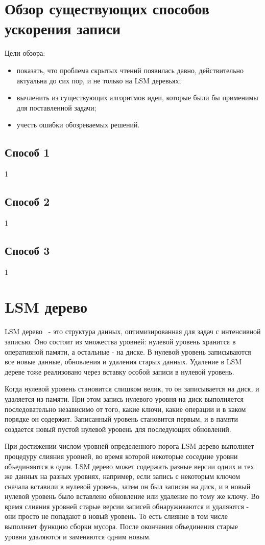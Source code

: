 \documentclass[a4paper,hidelinks,12pt]{article}
\begin{document}
\section{Обзор существующих способов ускорения записи}
Цели обзора:
\begin{itemize}
\item показать, что проблема скрытых чтений появилась давно, действительно
актуальна до сих пор, и не только на LSM деревьях;
\item вычленить из существующих алгоритмов идеи, которые были бы применимы для
поставленной задачи;
\item учесть ошибки обозреваемых решений.
\end{itemize}

\subsection{Способ 1}
1

\subsection{Способ 2}
1

\subsection{Способ 3}
1


\section{LSM дерево}
LSM дерево~\cite{lsm-intro} - это структура данных, оптимизированная для задач с
интенсивной записью. Оно состоит из множества уровней: нулевой уровень хранится
в оперативной памяти, а остальные - на диске. В нулевой уровень записываются все
новые данные, обновления и удаления старых данных. Удаление в LSM дереве тоже
реализовано через вставку особой записи в нулевой уровень.

Когда нулевой уровень становится слишком велик, то он записывается на диск, и
удаляется из памяти. При этом запись нулевого уровня на диск выполняется
последовательно независимо от того, какие ключи, какие операции и в каком
порядке он содержит. Записанный уровень становится первым, и в памяти создается
новый пустой нулевой уровень для последующих обновлений.

При достижении числом уровней определенного порога LSM дерево выполняет
процедуру слияния уровней, во время которой некоторые соседние уровни
объединяются в один. LSM дерево может содержать разные версии одних и тех же
данных на разных уровнях, например, если запись с некоторым ключом сначала
вставили в нулевой уровень, затем он был записан на диск, и в новый нулевой
уровень было вставлено обновление или удаление по тому же ключу. Во время
слияния уровней старые версии записей обнаруживаются и удаляются - они просто не
попадают в новый уровень. То есть слияние в том числе выполняет функцию сборки
мусора. После окончания объединения старые уровни удаляются и заменяются одним
новым.
\end{document}
